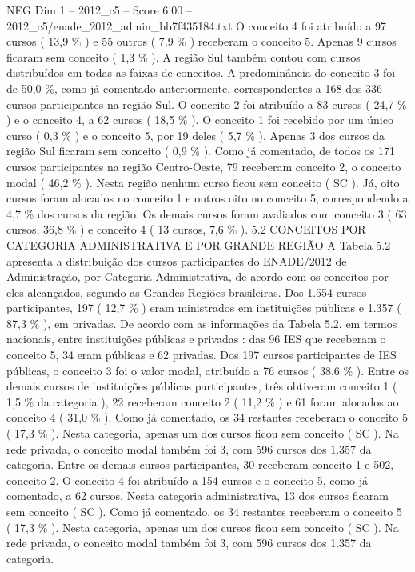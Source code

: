 \begin{textsample}{NEG Dim 1 – 2012\_c5 – Score 6.00 – 2012\_c5/enade\_2012\_admin\_bb7f435184.txt}
O conceito 4 foi atribuído a 97 cursos ( 13,9 \% ) e 55 outros ( 7,9 \% ) receberam o conceito 5.
Apenas 9 cursos ficaram sem conceito ( 1,3 \% ).
A região Sul também contou com cursos distribuídos em todas as faixas de conceitos.
A predominância do conceito 3 foi de 50,0 \%, como já comentado anteriormente, correspondentes a 168 dos 336 cursos participantes na região Sul.
O conceito 2 foi atribuído a 83 cursos ( 24,7 \% ) e o conceito 4, a 62 cursos ( 18,5 \% ).
O conceito 1 foi recebido por um único curso ( 0,3 \% ) e o conceito 5, por 19 deles ( 5,7 \% ).
Apenas 3 dos cursos da região Sul ficaram sem conceito ( 0,9 \% ).
Como já comentado, de todos os 171 cursos participantes na região Centro-Oeste, 79 receberam conceito 2, o conceito modal ( 46,2 \% ).
Nesta região nenhum curso ficou sem conceito ( SC ).
Já, oito cursos foram alocados no conceito 1 e outros oito no conceito 5, correspondendo a 4,7 \% dos cursos da região.
Os demais cursos foram avaliados com conceito 3 ( 63 cursos, 36,8 \% ) e conceito 4 ( 13 cursos, 7,6 \% ). 5.2 CONCEITOS POR CATEGORIA ADMINISTRATIVA E POR GRANDE REGIÃO A Tabela 5.2 apresenta a distribuição dos cursos participantes do ENADE/2012 de Administração, por Categoria Administrativa, de acordo com os conceitos por eles alcançados, segundo as Grandes Regiões brasileiras.
Dos 1.554 cursos participantes, 197 ( 12,7 \% ) eram ministrados em instituições públicas e 1.357 ( 87,3 \% ), em privadas.
De acordo com as informações da Tabela 5.2, em termos nacionais, entre instituições públicas e privadas : das 96 IES que receberam o conceito 5, 34 eram públicas e 62 privadas.
Dos 197 cursos participantes de IES públicas, o conceito 3 foi o valor modal, atribuído a 76 cursos ( 38,6 \% ).
Entre os demais cursos de instituições públicas participantes, três obtiveram conceito 1 ( 1,5 \% da categoria ), 22 receberam conceito 2 ( 11,2 \% ) e 61 foram alocados ao conceito 4 ( 31,0 \% ).
Como já comentado, os 34 restantes receberam o conceito 5 ( 17,3 \% ).
Nesta categoria, apenas um dos cursos ficou sem conceito ( SC ).
Na rede privada, o conceito modal também foi 3, com 596 cursos dos 1.357 da categoria.
Entre os demais cursos participantes, 30 receberam conceito 1 e 502, conceito 2.
O conceito 4 foi atribuído a 154 cursos e o conceito 5, como já comentado, a 62 cursos.
Nesta categoria administrativa, 13 dos cursos ficaram sem conceito ( SC ).
Como já comentado, os 34 restantes receberam o conceito 5 ( 17,3 \% ).
Nesta categoria, apenas um dos cursos ficou sem conceito ( SC ).
Na rede privada, o conceito modal também foi 3, com 596 cursos dos 1.357 da categoria.

\end{textsample}
